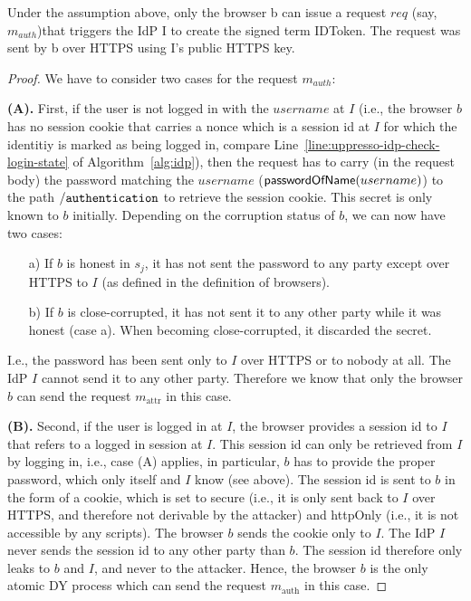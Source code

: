   \begin{lemma} %
    Under the assumption above, only the browser b can issue a 
    request $req$ (say, $m_{auth}$)that triggers the IdP I to 
    create the signed term IDToken. The request was sent by b 
    over HTTPS using I's public HTTPS key.
  \end{lemma}
  \begin{proof}
    We have to consider two cases for the request $m_{auth}$:
  
    \textbf{(A).} First, if the user is not logged in with the 
    $username$ at $I$ (i.e., the browser $b$ has no session 
    cookie that carries a nonce which is a session id at $I$ for 
    which the identitiy is marked as being logged in, compare 
    Line~\ref{line:uppresso-idp-check-login-state} of 
    Algorithm~\ref{alg:idp}), then the request has to carry (in
    the request body) the password matching the $username$ 
    ($\mathsf{passwordOfName}(username)$) to the path $\mathtt{/authentication}$ to 
    retrieve the session cookie. This secret is only known to 
    $b$ initially. Depending on the corruption status of $b$, we 
    can now have two cases:
    \begin{enumerate}
    \item[a)] If $b$ is honest in $s_j$, it has not sent the 
      password to any party except over HTTPS to $I$ (as defined 
      in the definition of browsers). 
    \item[b)] If $b$ is close-corrupted, it has not sent it to 
      any other party while it was honest (case a). When 
      becoming close-corrupted, it discarded the secret.
    \end{enumerate}
  
    I.e., the password has been sent only to $I$ over HTTPS or 
    to nobody at all. The IdP $I$ cannot send it to any other 
    party. Therefore we know that only the browser $b$ can send 
    the request $m_\text{attr}$ in this case.
  
    \textbf{(B).} Second, if the user is logged in at $I$, the 
    browser provides a session id to $I$ that refers to a 
    logged in session at $I$. This session id can only be 
    retrieved from $I$ by logging in, i.e., case (A) applies, 
    in particular, $b$ has to provide the proper password, 
    which only itself and $I$ know (see above). The session id 
    is sent to $b$ in the form of a cookie, which is set to 
    secure (i.e., it is only sent back to $I$ over HTTPS, and
    therefore not derivable by the attacker) and httpOnly 
    (i.e., it is not accessible by any scripts). The browser $b$ 
    sends the cookie only to $I$. The IdP $I$ never sends the 
    session id to any other party than $b$. The session id 
    therefore only leaks to $b$ and $I$, and never to the 
    attacker. Hence, the browser $b$ is the only atomic DY 
    process which can send the request $m_\text{auth}$ in this case.
  

\end{proof}
